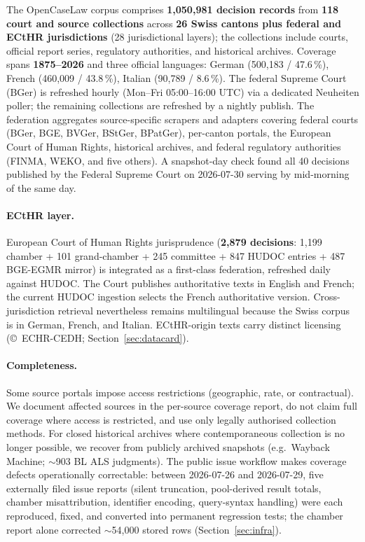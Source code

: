\documentclass[11pt,a4paper]{article}
\begin{document}
The OpenCaseLaw corpus comprises \textbf{1{,}050{,}981 decision records} from \textbf{118 court and source collections} across \textbf{26 Swiss cantons plus federal and ECtHR jurisdictions} (28 jurisdictional layers); the collections include courts, official report series, regulatory authorities, and historical archives. Coverage spans \textbf{1875--2026} and three official languages: German (500{,}183 / 47.6\,\%), French (460{,}009 / 43.8\,\%), Italian (90{,}789 / 8.6\,\%). The federal Supreme Court (BGer) is refreshed hourly (Mon--Fri 05:00--16:00 UTC) via a dedicated Neuheiten poller; the remaining collections are refreshed by a nightly publish. The federation aggregates source-specific scrapers and adapters covering federal courts (BGer, BGE, BVGer, BStGer, BPatGer), per-canton portals, the European Court of Human Rights, historical archives, and federal regulatory authorities (FINMA, WEKO, and five others). A snapshot-day check found all 40 decisions published by the Federal Supreme Court on 2026-07-30 serving by mid-morning of the same day.

\paragraph{ECtHR layer.} European Court of Human Rights jurisprudence (\textbf{2{,}879 decisions}: 1{,}199 chamber + 101 grand-chamber + 245 committee + 847 HUDOC entries + 487 BGE-EGMR mirror) is integrated as a first-class federation, refreshed daily against HUDOC. The Court publishes authoritative texts in English and French; the current HUDOC ingestion selects the French authoritative version. Cross-jurisdiction retrieval nevertheless remains multilingual because the Swiss corpus is in German, French, and Italian. ECtHR-origin texts carry distinct licensing (\copyright~ECHR-CEDH; Section~\ref{sec:datacard}).

\paragraph{Completeness.} Some source portals impose access restrictions (geographic, rate, or contractual). We document affected sources in the per-source coverage report, do not claim full coverage where access is restricted, and use only legally authorised collection methods. For closed historical archives where contemporaneous collection is no longer possible, we recover from publicly archived snapshots (e.g.\ Wayback Machine; $\sim$903 BL ALS judgments). The public issue workflow makes coverage defects operationally correctable: between 2026-07-26 and 2026-07-29, five externally filed issue reports (silent truncation, pool-derived result totals, chamber misattribution, identifier encoding, query-syntax handling) were each reproduced, fixed, and converted into permanent regression tests; the chamber report alone corrected $\sim$54{,}000 stored rows (Section~\ref{sec:infra}).
\end{document}
